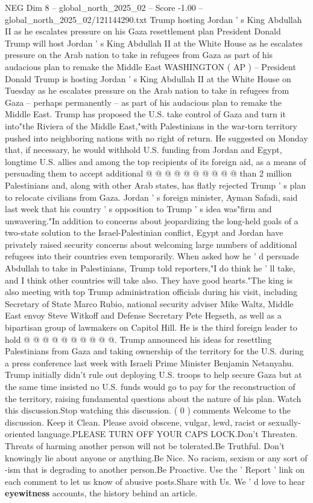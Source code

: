 \begin{textsample}{NEG Dim 8 – global\_north\_2025\_02 – Score -1.00 – global\_north\_2025\_02/121144290.txt}  \label{ex:f8_neg_144}
Trump hosting Jordan ' s King Abdullah II as he escalates pressure on his Gaza resettlement plan President Donald Trump will host Jordan ' s King Abdullah II at the White House as he escalates pressure on the Arab nation to take in refugees from Gaza as part of his audacious plan to remake the Middle East WASHINGTON ( AP ) -- President Donald Trump is hosting Jordan ' s King Abdullah II at the White House on Tuesday as he escalates pressure on the Arab nation to take in refugees from Gaza -- perhaps permanently -- as part of his audacious plan to remake the Middle East.
Trump has proposed the U.S. take control of Gaza and turn it into"the Riviera of the Middle East,"with Palestinians in the war-torn territory pushed into neighboring nations with no right of return.
He suggested on Monday that, if necessary, he would withhold U.S. funding from Jordan and Egypt, longtime U.S. allies and among the top recipients of its foreign aid, as a means of persuading them to accept additional @ @ @ @ @ @ @ @ @ @ than 2 million Palestinians and, along with other Arab states, has flatly rejected Trump ' s plan to relocate civilians from Gaza.
Jordan ' s foreign minister, Ayman Safadi, said last week that his country ' s opposition to Trump ' s idea was"firm and unwavering."In addition to concerns about jeopardizing the long-held goals of a two-state solution to the Israel-Palestinian conflict, Egypt and Jordan have privately raised security concerns about welcoming large numbers of additional refugees into their countries even temporarily.
When asked how he ' d persuade Abdullah to take in Palestinians, Trump told reporters,"I do think he ' ll take, and I think other countries will take also.
They have good hearts."The king is also meeting with top Trump administration officials during his visit, including Secretary of State Marco Rubio, national security adviser Mike Waltz, Middle East envoy Steve Witkoff and Defense Secretary Pete Hegseth, as well as a bipartisan group of lawmakers on Capitol Hill.
He is the third foreign leader to hold @ @ @ @ @ @ @ @ @ @.
Trump announced his ideas for resettling Palestinians from Gaza and taking ownership of the territory for the U.S. during a press conference last week with Israeli Prime Minister Benjamin Netanyahu.
Trump initially didn't rule out deploying U.S. troops to help secure Gaza but at the same time insisted no U.S. funds would go to pay for the reconstruction of the territory, raising fundamental questions about the nature of his plan.
Watch this discussion.Stop watching this discussion. ( 0 ) comments Welcome to the discussion.
Keep it Clean.
Please avoid obscene, vulgar, lewd, racist or sexually-oriented language.PLEASE TURN OFF YOUR CAPS LOCK.Don't Threaten.
Threats of harming another person will not be tolerated.Be Truthful.
Don't knowingly lie about anyone or anything.Be Nice.
No racism, sexism or any sort of -ism that is degrading to another person.Be Proactive.
Use the ' Report ' link on each comment to let us know of abusive posts.Share with Us.
We ' d love to hear \textbf{eyewitness} accounts, the history behind an article.

\end{textsample}

